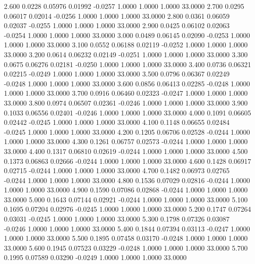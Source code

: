    2.600   0.0228   0.05976   0.01992  -0.0257   1.0000   1.0000   1.0000  33.0000
   2.700   0.0295   0.06017   0.02014  -0.0256   1.0000   1.0000   1.0000  33.0000
   2.800   0.0361   0.06059   0.02037  -0.0255   1.0000   1.0000   1.0000  33.0000
   2.900   0.0425   0.06102   0.02063  -0.0254   1.0000   1.0000   1.0000  33.0000
   3.000   0.0489   0.06145   0.02090  -0.0253   1.0000   1.0000   1.0000  33.0000
   3.100   0.0552   0.06188   0.02119  -0.0252   1.0000   1.0000   1.0000  33.0000
   3.200   0.0614   0.06232   0.02149  -0.0251   1.0000   1.0000   1.0000  33.0000
   3.300   0.0675   0.06276   0.02181  -0.0250   1.0000   1.0000   1.0000  33.0000
   3.400   0.0736   0.06321   0.02215  -0.0249   1.0000   1.0000   1.0000  33.0000
   3.500   0.0796   0.06367   0.02249  -0.0248   1.0000   1.0000   1.0000  33.0000
   3.600   0.0856   0.06413   0.02285  -0.0248   1.0000   1.0000   1.0000  33.0000
   3.700   0.0916   0.06460   0.02323  -0.0247   1.0000   1.0000   1.0000  33.0000
   3.800   0.0974   0.06507   0.02361  -0.0246   1.0000   1.0000   1.0000  33.0000
   3.900   0.1033   0.06556   0.02401  -0.0246   1.0000   1.0000   1.0000  33.0000
   4.000   0.1091   0.06605   0.02442  -0.0245   1.0000   1.0000   1.0000  33.0000
   4.100   0.1148   0.06655   0.02484  -0.0245   1.0000   1.0000   1.0000  33.0000
   4.200   0.1205   0.06706   0.02528  -0.0244   1.0000   1.0000   1.0000  33.0000
   4.300   0.1261   0.06757   0.02573  -0.0244   1.0000   1.0000   1.0000  33.0000
   4.400   0.1317   0.06810   0.02619  -0.0244   1.0000   1.0000   1.0000  33.0000
   4.500   0.1373   0.06863   0.02666  -0.0244   1.0000   1.0000   1.0000  33.0000
   4.600   0.1428   0.06917   0.02715  -0.0244   1.0000   1.0000   1.0000  33.0000
   4.700   0.1482   0.06973   0.02765  -0.0244   1.0000   1.0000   1.0000  33.0000
   4.800   0.1536   0.07029   0.02816  -0.0244   1.0000   1.0000   1.0000  33.0000
   4.900   0.1590   0.07086   0.02868  -0.0244   1.0000   1.0000   1.0000  33.0000
   5.000   0.1643   0.07144   0.02921  -0.0244   1.0000   1.0000   1.0000  33.0000
   5.100   0.1695   0.07204   0.02976  -0.0245   1.0000   1.0000   1.0000  33.0000
   5.200   0.1747   0.07264   0.03031  -0.0245   1.0000   1.0000   1.0000  33.0000
   5.300   0.1798   0.07326   0.03087  -0.0246   1.0000   1.0000   1.0000  33.0000
   5.400   0.1844   0.07394   0.03113  -0.0247   1.0000   1.0000   1.0000  33.0000
   5.500   0.1895   0.07458   0.03170  -0.0248   1.0000   1.0000   1.0000  33.0000
   5.600   0.1945   0.07523   0.03229  -0.0248   1.0000   1.0000   1.0000  33.0000
   5.700   0.1995   0.07589   0.03290  -0.0249   1.0000   1.0000   1.0000  33.0000
